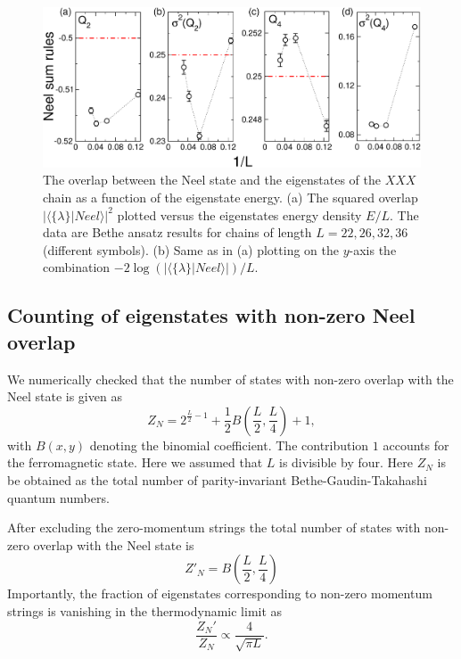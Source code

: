 \documentclass[11pt]{iopart}
\begin{document}
\begin{figure}[t]
\begin{center}
\includegraphics[width=.9\textwidth]{./draft_figs/QAMC_Obs_Neel}
\end{center}
\caption{ The overlap between the Neel state and the eigenstates of the 
 $XXX$ chain as a function of the eigenstate energy. (a) The squared 
 overlap $|\langle\{\lambda\}|Neel\rangle|^2$ plotted versus the 
 eigenstates energy density $E/L$. The data are Bethe ansatz results 
 for chains of length $L=22,26,32,36$ (different symbols). (b) Same as 
 in (a) plotting on the $y$-axis the combination $-2\log(|\langle\{
 \lambda\}|Neel\rangle|)/L$. 
}
\label{fig4-neel-ener}
\end{figure}

\subsection{Counting of eigenstates with non-zero Neel overlap}

We numerically checked that the number of states with non-zero overlap 
with the Neel state is given as 
%
\begin{equation}
Z_N=2^{\frac{L}{2}-1}+\frac{1}{2}B\left(\frac{L}{2},
\frac{L}{4}\right)+1,
\end{equation}
%
with $B(x,y)$ denoting the binomial coefficient. The contribution $1$ 
accounts for the ferromagnetic state. Here 
we assumed that $L$ is divisible by four. Here $Z_N$ is be obtained 
as the total number of parity-invariant Bethe-Gaudin-Takahashi quantum 
numbers. 

After excluding the zero-momentum strings the total number of states 
with non-zero overlap with the Neel state is 
%
\begin{equation}
\label{neel-ov-count}
Z'_{N}=B\left(\frac{L}{2},\frac{L}{4}\right)
\end{equation}
%
Importantly, the fraction of eigenstates corresponding to non-zero momentum 
strings is vanishing in the thermodynamic limit as 
%
\begin{equation}
\frac{Z_N'}{Z_N}\propto\frac{4}{\sqrt{\pi L}}.
\end{equation}
%
\end{document}
